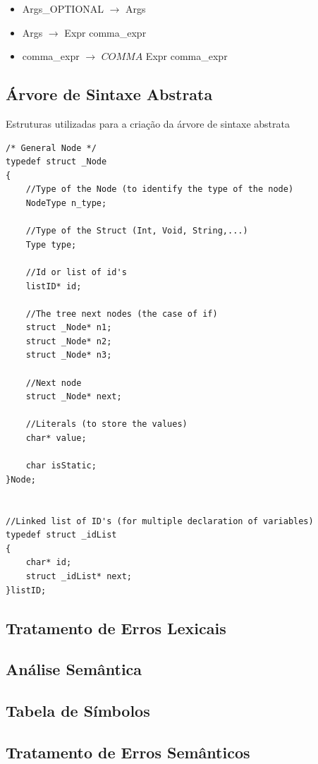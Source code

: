 \documentclass[12pt]{article}
\begin{document}
\begin{itemize}
  \item[] Args\_OPTIONAL $\longrightarrow$ Args
  \\
  \item[] Args $\longrightarrow$ Expr comma\_expr
  \\
  \item[] comma\_expr $\longrightarrow$ $COMMA$ Expr comma\_expr               
  
  
\end{itemize}


\subsection{Árvore de Sintaxe Abstrata}

Estruturas utilizadas para a criação da árvore de sintaxe abstrata
\begin{lstlisting}
/* General Node */
typedef struct _Node
{
    //Type of the Node (to identify the type of the node)
	NodeType n_type;

    //Type of the Struct (Int, Void, String,...)
	Type type;

    //Id or list of id's
    listID* id;

    //The tree next nodes (the case of if)
    struct _Node* n1;
    struct _Node* n2;
    struct _Node* n3;

    //Next node
    struct _Node* next;

    //Literals (to store the values)
    char* value;

    char isStatic;
}Node;


//Linked list of ID's (for multiple declaration of variables)
typedef struct _idList
{
	char* id;
	struct _idList* next;
}listID;

\end{lstlisting}
 


\subsection{Tratamento de Erros Lexicais}

\subsection{Análise Semântica}

\subsection{Tabela de Símbolos}

\subsection{Tratamento de Erros Semânticos}









	
	
\end{document}
